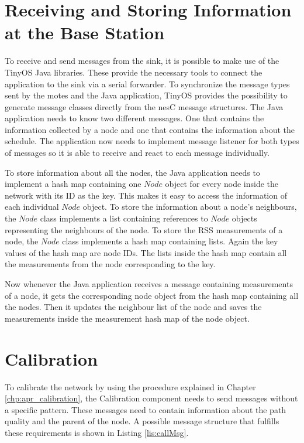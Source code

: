 
\section{Receiving and Storing Information at the Base Station}
\label{chp:imp_baseStation}
To receive and send messages from the sink, it is possible to make use of the TinyOS Java libraries. These provide the necessary tools to connect the application to the sink via a serial forwarder. To synchronize the message types sent by the motes and the Java application, TinyOS provides the possibility to generate message classes directly from the nesC message structures. The Java application needs to know two different messages. One that contains the information collected by a node and one that contains the information about the schedule. The application now needs to implement message listener for both types of messages so it is able to receive and react to each message individually.

To store information about all the nodes, the Java application needs to implement a hash map containing one $Node$ object for every node inside the network with its ID as the key. This makes it easy to access the information of each individual $Node$ object. To store the information about a node's neighbours, the $Node$ class implements a list containing references to $Node$ objects representing the neighbours of the node. To store the RSS measurements of a node, the $Node$ class implements a hash map containing lists. Again the key values of the hash map are node IDs. The lists inside the hash map contain all the measurements from the node corresponding to the key. 

Now whenever the Java application receives a message containing measurements of a node, it gets the corresponding node object from the hash map containing all the nodes. Then it updates the neighbour list of the node and saves the measurements inside the measurement hash map of the node object.
\section{Calibration}
\label{chp:imp_calibration}
To calibrate the network by using the procedure explained in Chapter \ref{chp:apr_calibration}, the Calibration component needs to send messages without a specific pattern. These messages need to contain information about the path quality and the parent of the node. A possible message structure that fulfills these requirements is shown in Listing \ref{lis:callMsg}. 

